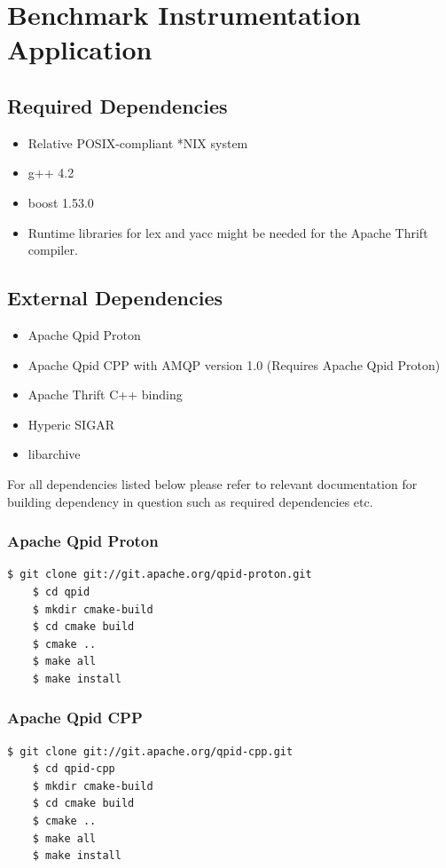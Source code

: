 \documentclass[11pt,a4paper]{article}
\begin{document}
\section{Benchmark Instrumentation Application}
\subsection{Required Dependencies}
\begin{itemize}
	\item Relative POSIX-compliant *NIX system
	\item g++ 4.2
	\item boost 1.53.0
	\item Runtime libraries for lex and yacc might be needed for the Apache Thrift compiler.
\end{itemize}

\subsection{External Dependencies}
\begin{itemize}
	\item Apache Qpid Proton
	\item Apache Qpid CPP with AMQP version 1.0 (Requires Apache Qpid Proton)
	\item Apache Thrift C++ binding
	\item Hyperic SIGAR
	\item libarchive
\end{itemize}

For all dependencies listed below please refer to relevant documentation for building dependency in question such as required dependencies etc.

\subsubsection{Apache Qpid Proton}
\begin{lstlisting}[language=bash]
  	$ git clone git://git.apache.org/qpid-proton.git
	$ cd qpid
	$ mkdir cmake-build
	$ cd cmake build
	$ cmake ..
	$ make all
	$ make install
\end{lstlisting}

\subsubsection{Apache Qpid CPP}
\begin{lstlisting}[language=bash]
	$ git clone git://git.apache.org/qpid-cpp.git
	$ cd qpid-cpp
	$ mkdir cmake-build
	$ cd cmake build
	$ cmake ..
	$ make all
	$ make install
\end{lstlisting}
\end{document}
